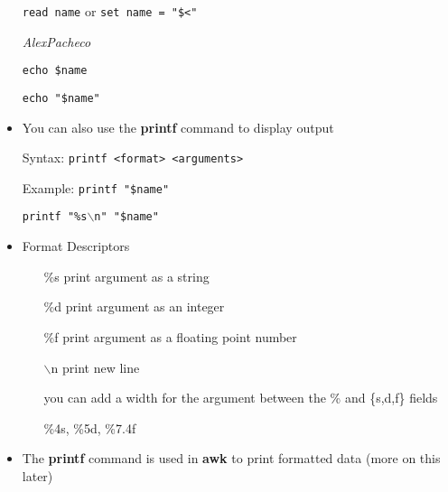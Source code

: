 \documentclass[10pt,t]{beamer}
\begin{document}
\begin{frame}
\begin{itemize}
    \item[] \texttt{read name\enter} or \texttt{set name = "\$<"\enter}
    \item[] \textit{Alex\quad\quad\quad Pacheco\enter}
    \item[] \texttt{echo \$name\enter}
    \item[] \texttt{echo "\$name"\enter}
    \framebreak
    \item You can also use the \textbf{printf} command to display output
    \item[]Syntax: \texttt{printf <format> <arguments>}
    \item[]Example: \texttt{printf "\$name"\enter}
    \item[] \texttt{printf "\%s$\backslash$n" "\$name"\enter}
    \item Format Descriptors
    \begin{enumerate}
        \item[\%s] print argument as a string
        \item[\%d] print argument as an integer
        \item[\%f] print argument as a floating point number
        \item[$\backslash$n] print new line
        \item[] you can add a width for the argument between the \% and \{s,d,f\} fields
        \item[] \%4s, \%5d, \%7.4f
    \end{enumerate}
    \item The \textbf{printf} command is used in \textbf{awk} to print formatted data (more on this later) 
  \end{itemize}
\end{frame}
\end{document}
